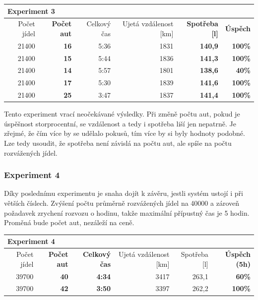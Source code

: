 \documentclass[a4paper, 11pt]{article}
\begin{document}
	\begin{table}[h!]
		\centering
		\begin{tabular}{|r|r|r|r|r|r|}
			\hline
			\multicolumn{6}{|l|}{\textbf{Experiment 3}}   \\ \hline
			 Počet jídel & \textbf{Počet aut} & Celkový čas & Ujetá vzdálenost [km] & \textbf{Spotřeba [l]} & \textbf{Úspěch} \\ \hline
			 21400 & \textbf{16} & 5:36 & 1831 & \textbf{140,9} & \textbf{100\%} \\ \hline
			 21400 & \textbf{15} & 5:44 & 1836 & \textbf{141,3} & \textbf{100\%} \\ \hline
			 21400 & \textbf{14} & 5:57 & 1801 & \textbf{138,6} & \textbf{40\%}  \\ \hline
			 21400 & \textbf{17} & 5:30 & 1839 & \textbf{141,6} & \textbf{100\%} \\ \hline
			 21400 & \textbf{25} & 3:47 & 1837 & \textbf{141,4} & \textbf{100\%} \\ \hline
		\end{tabular}
	\end{table}

	Tento experiment vrací neočekávané výsledky. Při změně počtu aut, pokud je 
	úspěšnost storprocentní, se vzdálenost a tedy i spotřeba liší jen nepatrně.
	Je zřejmé, že čím více by se udělalo pokusů, tím více by si byly hodnoty podobné.
	Lze tedy usoudit, že spotřeba není závislá na počtu aut, ale spíše na počtu
	rozvážených jídel.

	\subsubsection{Experiment 4}

	Díky poslednímu experimentu je snaha dojít k závěru, jestli systém ustojí
	i při větších číslech. Zvýšení počtu průměrně rozvážených jídel na 40000 a
	zároveň požadavek zrychení rozvozu o hodinu, takže maximální přípustný čas
	je 5 hodin. Proměná bude počet aut, nezáleží na ceně.

	\begin{table}[h!]
		\centering
		\begin{tabular}{|r|r|r|r|r|r|}
			\hline
			\multicolumn{6}{|l|}{\textbf{Experiment 4}}   \\ \hline
			 Počet jídel & \textbf{Počet aut} & \textbf{Celkový čas} & Ujetá vzdálenost [km] & Spotřeba [l] & \textbf{Úspěch (5h)} \\ \hline
			 39700 & \textbf{40} & \textbf{4:34} & 3417 & 263,1 & \textbf{60\%}  \\ \hline
			 39700 & \textbf{42} & \textbf{3:50} & 3397 & 262,2 & \textbf{100\%} \\ \hline
		\end{tabular}
	\end{table}
\end{document}
